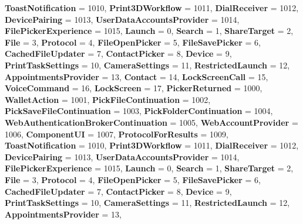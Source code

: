\begin{DoxyCompactItemize}
{\bfseries Toast\+Notification} = 1010, 
{\bfseries Print3\+D\+Workflow} = 1011, 
{\bfseries Dial\+Receiver} = 1012, 
\newline
{\bfseries Device\+Pairing} = 1013, 
{\bfseries User\+Data\+Accounts\+Provider} = 1014, 
{\bfseries File\+Picker\+Experience} = 1015, 
{\bfseries Launch} = 0, 
\newline
{\bfseries Search} = 1, 
{\bfseries Share\+Target} = 2, 
{\bfseries File} = 3, 
{\bfseries Protocol} = 4, 
\newline
{\bfseries File\+Open\+Picker} = 5, 
{\bfseries File\+Save\+Picker} = 6, 
{\bfseries Cached\+File\+Updater} = 7, 
{\bfseries Contact\+Picker} = 8, 
\newline
{\bfseries Device} = 9, 
{\bfseries Print\+Task\+Settings} = 10, 
{\bfseries Camera\+Settings} = 11, 
{\bfseries Restricted\+Launch} = 12, 
\newline
{\bfseries Appointments\+Provider} = 13, 
{\bfseries Contact} = 14, 
{\bfseries Lock\+Screen\+Call} = 15, 
{\bfseries Voice\+Command} = 16, 
\newline
{\bfseries Lock\+Screen} = 17, 
{\bfseries Picker\+Returned} = 1000, 
{\bfseries Wallet\+Action} = 1001, 
{\bfseries Pick\+File\+Continuation} = 1002, 
\newline
{\bfseries Pick\+Save\+File\+Continuation} = 1003, 
{\bfseries Pick\+Folder\+Continuation} = 1004, 
{\bfseries Web\+Authentication\+Broker\+Continuation} = 1005, 
{\bfseries Web\+Account\+Provider} = 1006, 
\newline
{\bfseries Component\+UI} = 1007, 
{\bfseries Protocol\+For\+Results} = 1009, 
{\bfseries Toast\+Notification} = 1010, 
{\bfseries Print3\+D\+Workflow} = 1011, 
\newline
{\bfseries Dial\+Receiver} = 1012, 
{\bfseries Device\+Pairing} = 1013, 
{\bfseries User\+Data\+Accounts\+Provider} = 1014, 
{\bfseries File\+Picker\+Experience} = 1015, 
\newline
{\bfseries Launch} = 0, 
{\bfseries Search} = 1, 
{\bfseries Share\+Target} = 2, 
{\bfseries File} = 3, 
\newline
{\bfseries Protocol} = 4, 
{\bfseries File\+Open\+Picker} = 5, 
{\bfseries File\+Save\+Picker} = 6, 
{\bfseries Cached\+File\+Updater} = 7, 
\newline
{\bfseries Contact\+Picker} = 8, 
{\bfseries Device} = 9, 
{\bfseries Print\+Task\+Settings} = 10, 
{\bfseries Camera\+Settings} = 11, 
\newline
{\bfseries Restricted\+Launch} = 12, 
{\bfseries Appointments\+Provider} = 13, 

\end{DoxyCompactItemize}
